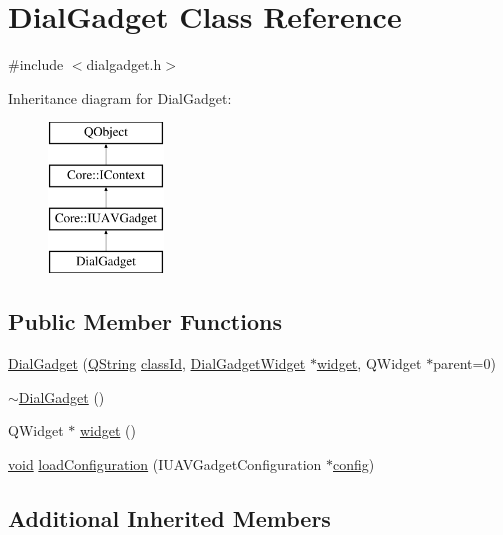 \hypertarget{class_dial_gadget}{\section{Dial\-Gadget Class Reference}
\label{class_dial_gadget}
}


{\ttfamily \#include $<$dialgadget.\-h$>$}

Inheritance diagram for Dial\-Gadget\-:\begin{figure}[H]
\begin{center}
\leavevmode
\includegraphics[height=4.000000cm]{class_dial_gadget}
\end{center}
\end{figure}
\subsection*{Public Member Functions}
\begin{DoxyCompactItemize}
\item 
\hyperlink{group___dial_plugin_gaef5c9e1077a9a230622054bcc5337958}{Dial\-Gadget} (\hyperlink{group___u_a_v_objects_plugin_gab9d252f49c333c94a72f97ce3105a32d}{Q\-String} \hyperlink{group___core_plugin_ga3878fde66a57220608960bcc3fbeef2c}{class\-Id}, \hyperlink{class_dial_gadget_widget}{Dial\-Gadget\-Widget} $\ast$\hyperlink{group___dial_plugin_ga1afd77bac7b60ceae978b7e74f9eddee}{widget}, Q\-Widget $\ast$parent=0)
\item 
\hyperlink{group___dial_plugin_ga9fc6ec1cdb4ac0de853c9b35950c4d11}{$\sim$\-Dial\-Gadget} ()
\item 
Q\-Widget $\ast$ \hyperlink{group___dial_plugin_ga1afd77bac7b60ceae978b7e74f9eddee}{widget} ()
\item 
\hyperlink{group___u_a_v_objects_plugin_ga444cf2ff3f0ecbe028adce838d373f5c}{void} \hyperlink{group___dial_plugin_ga571fd73249a763cfe4850be854e3dbc6}{load\-Configuration} (I\-U\-A\-V\-Gadget\-Configuration $\ast$\hyperlink{deflate_8c_a4473b5227787415097004fd39f55185e}{config})
\end{DoxyCompactItemize}
\subsection*{Additional Inherited Members}


